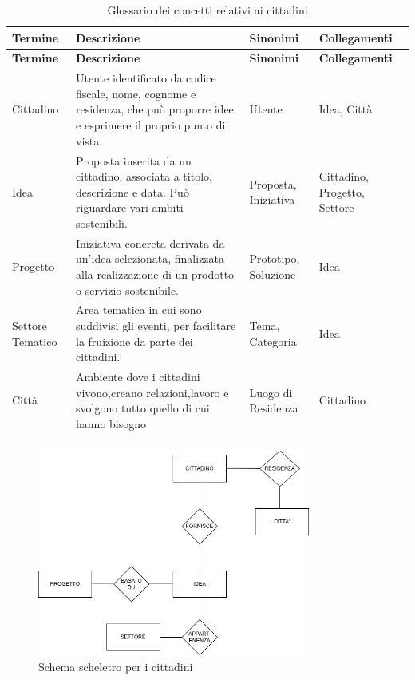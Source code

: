 \documentclass{article}
\begin{document}
\begin{longtable}{|p{3cm}|p{6.5cm}|p{2.5cm}|p{3cm}|}

\hline
\textbf{Termine} & \textbf{Descrizione} & \textbf{Sinonimi} & \textbf{Collegamenti} \\
\hline
\endfirsthead

\hline
\textbf{Termine} & \textbf{Descrizione} & \textbf{Sinonimi} & \textbf{Collegamenti} \\
\hline
\endhead

Cittadino & Utente identificato da codice fiscale, nome, cognome e residenza, che può proporre idee e esprimere il proprio punto di vista. & Utente & Idea, Città \\
\hline

Idea & Proposta inserita da un cittadino, associata a titolo, descrizione e data. Può riguardare vari ambiti sostenibili. & Proposta, Iniziativa & Cittadino, Progetto, Settore \\
\hline

Progetto & Iniziativa concreta derivata da un'idea selezionata, finalizzata alla realizzazione di un prodotto o servizio sostenibile. & Prototipo, Soluzione & Idea \\
\hline

Settore Tematico & Area tematica in cui sono suddivisi gli eventi, per facilitare la fruizione da parte dei cittadini. & Tema, Categoria & Idea \\
\hline

Città &  Ambiente dove i cittadini vivono,creano relazioni,lavoro e svolgono tutto quello di cui hanno bisogno & Luogo di Residenza & Cittadino \\
\hline

\caption{Glossario dei concetti relativi ai cittadini}
\label{tab:glossario-cittadini}
\\
\end{longtable}

\begin{figure}[H]
    \centering
    \includegraphics[width=0.8\textwidth]{images/SCHELETRO_CITTADINO.drawio.png}
    \caption{Schema scheletro per i cittadini}
    \label{fig:schema-sostenibilita}
\end{figure}
\end{document}
